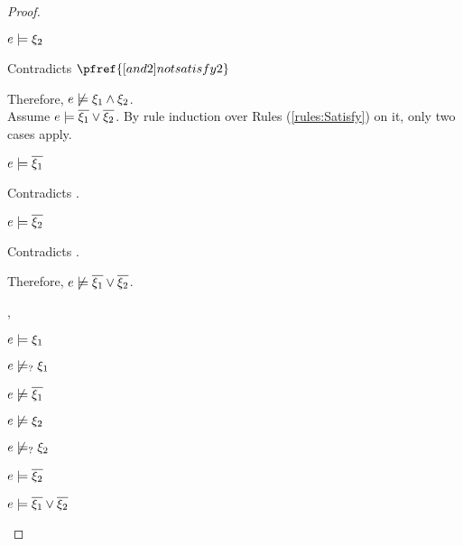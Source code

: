 \begin{proof}
\begin{byCases}
\begin{byCases}
\begin{byCases}
            \begin{pfsteps*}
            \item $e \models \xi_2$ 
            \end{pfsteps*}
            Contradicts $\pfref{[and2]notsatisfy2}$
        \end{byCases}
        Therefore, $e \not\models \xi_1 \wedge \xi_2$.\\
        Assume $e \models \overline{\xi_1} \vee \overline{\xi_2}$. By rule induction over Rules (\ref{rules:Satisfy}) on it, only two cases apply.
        \begin{byCases}
        \item[\text{(\ref{rule:CSOr1})}]
            \begin{pfsteps*}
            \item $e \models \overline{\xi_1}$ 
            \end{pfsteps*}
            Contradicts .
        \item[\text{(\ref{rule:CSOr2})}]
            \begin{pfsteps*}
            \item $e \models \overline{\xi_2}$ 
            \end{pfsteps*}
            Contradicts .
        \end{byCases}
        Therefore, $e \not\models \overline{\xi_1} \vee \overline{\xi_2}$.
    \item[\csatisfy{e}{\xi_1},\csatisfy{e}{\cdual{\xi_2}}]
        \begin{pfsteps*}
        \item $e \models \xi_1$  
        \item $e \not\models_{?} \xi_1$  
        \item $e \not\models \overline{\xi_1}$  
        \item $e \not\models \xi_2$  
        \item $e \not\models_{?} \xi_2$  
        \item $e \models \overline{\xi_2}$  
        \item $e \models \overline{\xi_1} \vee \overline{\xi_2}$  

\end{pfsteps*}
\end{byCases}
\end{byCases}
\end{proof}
